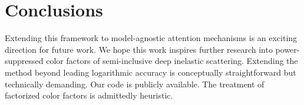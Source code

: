 \section{Conclusions}\label{sec:conclusions}

Extending this framework to model-agnostic attention mechanisms is an
exciting direction for future work. We hope this work inspires further
research into power-suppressed color factors of semi-inclusive deep
inelastic scattering. Extending the method beyond leading logarithmic
accuracy is conceptually straightforward but technically demanding. Our
code is publicly available. The treatment of factorized color factors is
admittedly heuristic.

